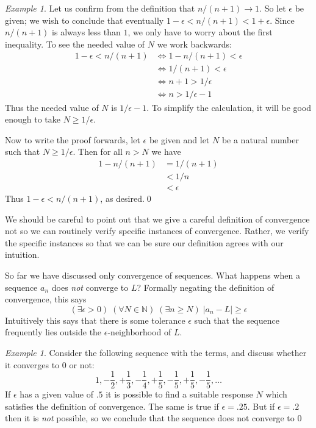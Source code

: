 \documentclass[11pt,oneside]{amsbook}
\newcommand{\NN}{\mathbb N}
\theoremstyle{definition}
\theoremstyle{plain}
\theoremstyle{definition}
\theoremstyle{remark}
\newtheorem{example}[thm]{Example}
\numberwithin{equation}{section}
\numberwithin{figure}{section}
\begin{document}
\begin{example}
  Let us confirm from the definition that $n/(n+1)\to1$. So let $\epsilon$ be given; we wish to conclude that eventually $1-\epsilon<n/(n+1)<1+\epsilon$. Since $n/(n+1)$ is always less than $1$, we only have to worry about the first inequality. To see the needed value of $N$ we work backwards:
  \begin{align*}
    1-\epsilon<n/(n+1)&\iff 1-n/(n+1)<\epsilon \\
                      &\iff 1/(n+1)<\epsilon \\
                      &\iff n+1>1/\epsilon \\
                      &\iff n>1/\epsilon-1
  \end{align*}
  Thus the needed value of $N$ is $1/\epsilon-1$. To simplify the calculation, it will be good enough to take $N\geq1/\epsilon$.
  
  Now to write the proof forwards, let $\epsilon$ be given and let $N$ be a natural number such that $N\geq1/\epsilon$. Then for all $n>N$ we have
  \begin{align*}
    1-n/(n+1) &= 1/(n+1)\\
              &< 1/n\\
              &<\epsilon
  \end{align*}
  Thus $1-\epsilon < n/(n+1)$, as desired.\qed
\end{example}

We should be careful to point out that we give a careful definition of convergence not so we can routinely verify specific instances of convergence. Rather, we verify the specific instances so that we can be sure our definition agrees with our intuition.


So far we have discussed only convergence of sequences. What happens when a sequence $a_n$ does \emph{not} converge to $L$? Formally negating the definition of convergence, this says
\[(\exists\epsilon>0)\;(\forall N\in\NN)\;(\exists n\geq N)\;|a_n-L|\geq\epsilon
\]
Intuitively this says that there is some tolerance $\epsilon$ such that the sequence frequently lies outside the $\epsilon$-neighborhood of $L$.

\begin{example}
  Consider the following sequence with the terms, and discuss whether it converges to $0$ or not:
  \[1,-\frac12,+\frac13,-\frac14,+\frac15,-\frac15,+\frac15,-\frac15,\ldots
  \]
  If $\epsilon$ has a given value of $.5$ it is possible to find a suitable response $N$ which satisfies the definition of convergence. The same is true if $\epsilon=.25$. But if $\epsilon=.2$ then it is \emph{not} possible, so we conclude that the sequence does not converge to $0$
\end{example}
\end{document}
